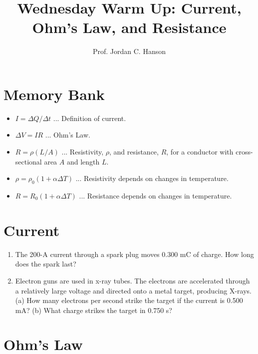 \documentclass{article}
\begin{document}
\twocolumn

\title{Wednesday Warm Up: Current, Ohm's Law, and Resistance}
\author{Prof. Jordan C. Hanson}

\maketitle

\section{Memory Bank}

\begin{itemize}
\item $I = \Delta Q / \Delta t$ ... Definition of current.
\item $\Delta V = I R$ ... Ohm's Law.
\item $R = \rho (L/A)$ ... Resistivity, $\rho$, and resistance, $R$, for a conductor with cross-sectional area $A$ and length $L$.
\item $\rho = \rho_0(1+\alpha \Delta T)$ ... Resistivity depends on changes in temperature.
\item $R = R_0(1+\alpha \Delta T)$ ... Resistance depends on changes in temperature.
\end{itemize}

\section{Current}

\begin{enumerate}
\item The 200-A current through a spark plug moves 0.300 mC of charge. How long does the spark last? \\ \vspace{1cm}
\item Electron guns are used in x-ray tubes. The electrons are accelerated through a relatively large voltage and directed onto a metal target, producing X-rays. (a) How many electrons per second strike the target if the current is 0.500 mA? (b) What charge strikes the target in 0.750 s? \\ \vspace{1.5cm}
\end{enumerate}

\section{Ohm's Law}
\end{document}
